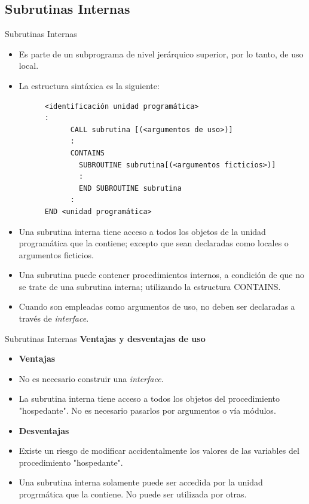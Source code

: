 \subsection{Subrutinas Internas}

\begin{frame}[fragile]{Subrutinas Internas}
 \begin{itemize}[<+(0)->]
  \item Es parte de un subprograma de nivel jerárquico superior, por lo tanto, de uso local.
  \item La estructura sintáxica es la siguiente:
   \vspace{0.15cm}
      \begin{verbatim}
      <identificación unidad programática>
      :
            CALL subrutina [(<argumentos de uso>)]
            :
            CONTAINS
              SUBROUTINE subrutina[(<argumentos ficticios>)]
              :
              END SUBROUTINE subrutina
            :
      END <unidad programática>
      \end{verbatim}
 \end{itemize}
\end{frame}

\begin{frame}
  \begin{itemize}[<+(0)->]
    \item Una subrutina interna tiene acceso a todos los objetos de la unidad programática que la contiene; excepto que sean declaradas como locales o argumentos ficticios.
    \item Una subrutina puede contener procedimientos internos, a condición de que no se trate de una subrutina interna; utilizando la estructura CONTAINS.
    \item Cuando son empleadas como argumentos de uso, no deben ser declaradas a través de \emph{interface}.
  \end{itemize}
\end{frame}

\begin{frame}[fragile]{Subrutinas Internas}
 \textbf{Ventajas y desventajas de uso}
  \begin{itemize}[<+(0)->]
   \item [] \textbf{Ventajas}
   \item No es necesario construir una \emph{interface}.
   \item La subrutina interna tiene acceso a todos los objetos del procedimiento "hospedante". No es necesario pasarlos por argumentos o vía módulos.
   \item [] \textbf{Desventajas}
   \item Existe un riesgo de modificar accidentalmente los valores de las variables del procedimiento "hospedante".
   \item Una subrutina interna solamente puede ser accedida por la unidad progrmática que la contiene. No puede ser utilizada por otras.
 \end{itemize}
\end{frame}


